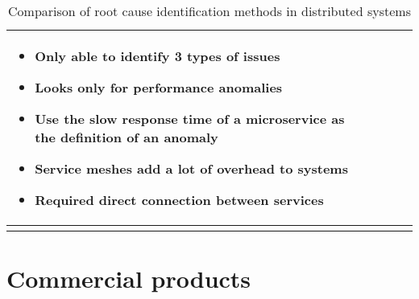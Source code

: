 \begin{longtable}{| p{20mm} | p{43mm} | p{43mm} | p{43mm} |}
  \begin{itemize}[leftmargin=*,noitemsep,nolistsep] 
    \item Only able to identify 3 types of issues
    \item Looks only for performance anomalies
    \item Use the slow response time of a microservice as the definition of an anomaly
    \item Service meshes add a lot of overhead to systems
    \item Required direct connection between services
  \vspace{-7mm}
  \end{itemize} \\ \hline
  \caption{Comparison of root cause identification methods in distributed systems}
\end{longtable}

\section{Commercial products}


